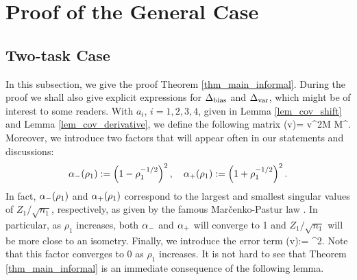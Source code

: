 \section{Proof of the General Case}\label{sec_proof_general}

\subsection{Two-task Case}\label{app_proof_main_thm}

In this subsection, we give the proof Theorem \ref{thm_main_informal}. During the proof we shall also give explicit expressions for $\Delta_{\text{bias}}$ and $\Delta_{\text{var}}$, which might be of interest to some readers.
With $a_i$, $i=1,2,3,4$, given in Lemma \ref{lem_cov_shift} and Lemma \ref{lem_cov_derivative}, 
we define the following matrix
\be\label{defnpihat}\Pi \equiv \Pi(\hat v)= \cdot \hat v^2{M}  {M}^{\top}.\ee
Moreover, we introduce two factors that will appear often in our statements and discussions:
$$\alpha_-(\rho_1):=\left(1- \rho_1^{-1/2}\right)^2,\quad \alpha_+(\rho_1):=\left(1 + \rho_1^{-1/2}\right)^2.$$ 
In fact, $\alpha_-(\rho_1)$ and $\alpha_+(\rho_1)$ correspond to the largest and smallest singular values of $Z_1/\sqrt{n_1}$, respectively, as given by the famous Mar{\v c}enko-Pastur law \cite{MP}. In particular, as $\rho_1$ increases, both $\alpha_-$ and $\alpha_+$ will converge to 1 and $Z_1/\sqrt{n_1}$ will be more close to an isometry. Finally, we introduce the error term  
\be\label{eq_deltaextra} 
 \delta(\hat v):= \cdot  {}^2.\ee
Note that this factor converges to 0 as $\rho_1$ increases. It is not hard to see that Theorem \ref{thm_main_informal} is an immediate consequence of the following lemma.






